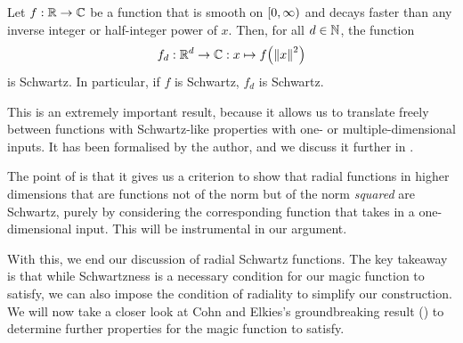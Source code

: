 \begin{boxproposition}\label{Ch3:Prop:Multidimensional_Schwartz_of_Schwartz}
    Let $f : \mathbb{R} \to \mathbb{C}$ be a function that is smooth on $\left[0, \infty\right)$ and decays faster than any inverse integer or half-integer power of $x$. Then, for all $d \in \mathbb{N}$, the function
    \begin{align*}
        f_d : \mathbb{R}^d \to \mathbb{C} : x \mapsto f\!\left( \left\lVert x \right\rVert^2 \right)
    \end{align*}
    is Schwartz. In particular, if $f$ is Schwartz, $f_d$ is Schwartz.
\end{boxproposition}

This is an extremely important result, because it allows us to translate freely between functions with Schwartz-like properties with one- or multiple-dimensional inputs. It has been formalised by the author, and we discuss it further in .

The point of  is that it gives us a criterion to show that radial functions in higher dimensions that are functions not of the norm but of the norm \textit{squared} are Schwartz, purely by considering the corresponding function that takes in a one-dimensional input. This will be instrumental in our argument.

With this, we end our discussion of radial Schwartz functions. The key takeaway is that while Schwartzness is a necessary condition for our magic function to satisfy, we can also impose the condition of radiality to simplify our construction. We will now take a closer look at Cohn and Elkies's groundbreaking result () to determine further properties for the magic function to satisfy.